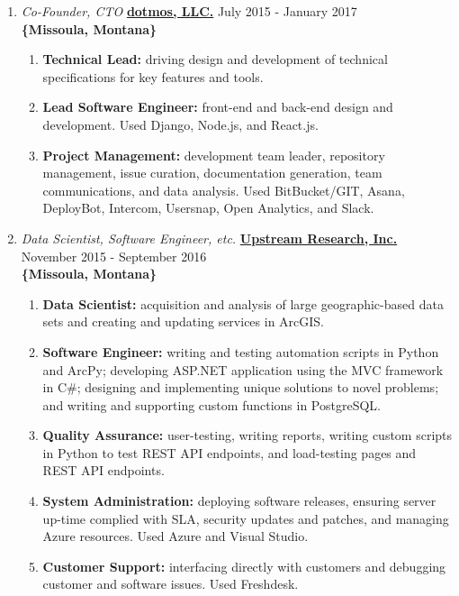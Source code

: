 \documentclass[oneside]{article}%
\begin{document}
\begin{enumerate}[]
\begin{enumerate}[]
\begin{enumerate}[-]
				\end{enumerate}
		\end{enumerate}
	\item \textit{Co-Founder, CTO} \textbf{\href{https://dotmos.com}{dotmos, LLC.}} \hfill July 2015 - January 2017\\
		\textbf{\{Missoula, Montana\}}
		\begin{enumerate}[*]
			\item \textbf{Technical Lead:} driving design and development of technical specifications for key features and tools.
			\item \textbf{Lead Software Engineer:} front-end and back-end design and development. Used Django, Node.js, and React.js.
			\item \textbf{Project Management:} development team leader, repository management, issue curation, documentation generation, team communications, and data analysis. Used BitBucket/GIT, Asana, DeployBot, Intercom, Usersnap, Open Analytics, and Slack.
		\end{enumerate}
	\item \textit{Data Scientist, Software Engineer, etc.} \textbf{\href{https://upstreamresearch.com}{Upstream Research, Inc.}} \hfill November 2015 - September 2016\\
		\textbf{\{Missoula, Montana\}}
		\begin{enumerate}[*]
			\item \textbf{Data Scientist:} acquisition and analysis of large geographic-based data sets and creating and updating services in ArcGIS.
			\item \textbf{Software Engineer:} writing and testing automation scripts in Python and ArcPy; developing ASP.NET application using the MVC framework in C\#; designing and implementing unique solutions to novel problems; and writing and supporting custom functions in PostgreSQL.
			\item \textbf{Quality Assurance:} user-testing, writing reports, writing custom scripts in Python to test REST API endpoints, and load-testing pages and REST API endpoints.
			\item \textbf{System Administration:} deploying software releases, ensuring server up-time complied with SLA, security updates and patches, and managing Azure resources. Used Azure and Visual Studio.
			\item \textbf{Customer Support:} interfacing directly with customers and debugging customer and software issues. Used Freshdesk.
		\end{enumerate}

\end{enumerate}
\end{document}
